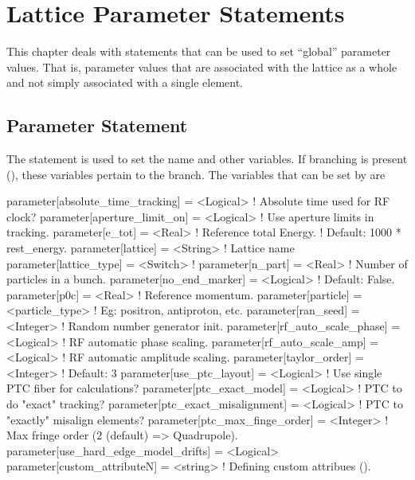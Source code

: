 \chapter{Lattice Parameter Statements}

This chapter deals with statements that can be used to set ``global''
parameter values. That is, parameter values that are associated with
the lattice as a whole and not simply associated with a single element.

\section{Parameter Statement}
\label{s:param}


The  statement is used to set the  name and
other variables. If branching is present (), these
variables pertain to the  branch. The variables that can be
set by  are
\begin{example}
  parameter[absolute_time_tracking] = <Logical>  ! Absolute time used for RF clock?
  parameter[aperture_limit_on]      = <Logical>  ! Use aperture limits in tracking.
  parameter[e_tot]         = <Real>          ! Reference total Energy. 
                                             !      Default: 1000 * rest_energy.
  parameter[lattice]       = <String>        ! Lattice name 
  parameter[lattice_type]  = <Switch>        ! 
  parameter[n_part]        = <Real>          ! Number of particles in a bunch.
  parameter[no_end_marker] = <Logical>       ! Default: False.
  parameter[p0c]           = <Real>          ! Reference momentum.
  parameter[particle]      = <particle_type> ! Eg: positron, antiproton, etc.
  parameter[ran_seed]      = <Integer>       ! Random number generator init.
  parameter[rf_auto_scale_phase]    = <Logical>  ! RF automatic phase scaling.
  parameter[rf_auto_scale_amp]      = <Logical>  ! RF automatic amplitude scaling.
  parameter[taylor_order]           = <Integer>  ! Default: 3
  parameter[use_ptc_layout]         = <Logical>  ! Use single PTC fiber for calculations?
  parameter[ptc_exact_model]        = <Logical>  ! PTC to do "exact" tracking?
  parameter[ptc_exact_misalignment] = <Logical>  ! PTC to "exactly" misalign elements?
  parameter[ptc_max_finge_order]    = <Integer>  ! Max fringe order (2 (default) => Quadrupole).
  parameter[use_hard_edge_model_drifts] = <Logical>
  parameter[custom_attributeN]      = <string>   ! Defining custom attribues ().
\end{example}

